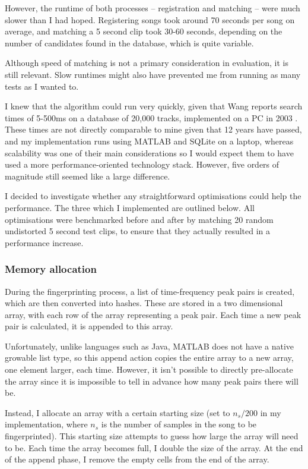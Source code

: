 \documentclass[12pt,a4paper,twoside,openright]{report}
\begin{document}
However, the runtime of both processes -- registration and matching -- were much slower than I had hoped. Registering songs took around 70 seconds per song on average, and matching a 5 second clip took 30-60 seconds, depending on the number of candidates found in the database, which is quite variable.

Although speed of matching is not a primary consideration in evaluation, it is still relevant. Slow runtimes might also have prevented me from running as many tests as I wanted to. 

I knew that the algorithm could run very quickly, given that Wang reports search times of 5-500ms on a database of 20,000 tracks, implemented on a PC in 2003 \cite{Wang03}. These times are not directly comparable to mine given that 12 years have passed, and my implementation runs using MATLAB and SQLite on a laptop, whereas scalability was one of their main considerations so I would expect them to have used a more performance-oriented technology stack. However, five orders of magnitude still seemed like a large difference. 

I decided to investigate whether any straightforward optimisations could help the performance. The three which I implemented are outlined below. All optimisations were benchmarked before and after by matching 20 random undistorted 5 second test clips, to ensure that they actually resulted in a performance increase.

\subsubsection{Memory allocation}

During the fingerprinting process, a list of time-frequency peak pairs is created, which are then converted into hashes. These are stored in a two dimensional array, with each row of the array representing a peak pair. Each time a new peak pair is calculated, it is appended to this array.

Unfortunately, unlike languages such as Java, MATLAB does not have a native growable list type, so this append action copies the entire array to a new array, one element larger, each time. However, it isn't possible to directly pre-allocate the array since it is impossible to tell in advance how many peak pairs there will be.

Instead, I allocate an array with a certain starting size (set to $n_s/200$ in my implementation, where $n_s$ is the number of samples in the song to be fingerprinted). This starting size attempts to guess how large the array will need to be. Each time the array becomes full, I double the size of the array. At the end of the append phase, I remove the empty cells from the end of the array.
\end{document}

